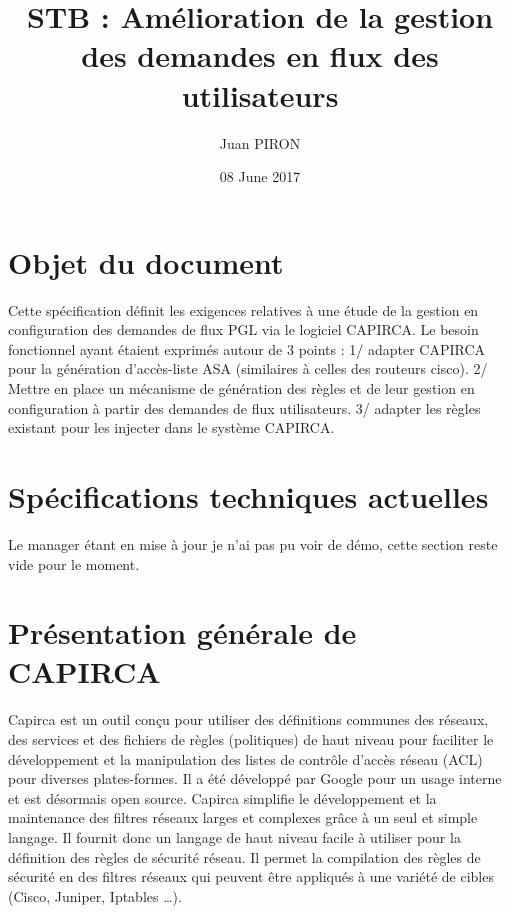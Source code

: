 \documentclass{article}
\title{STB : Amélioration de la gestion des demandes en flux des utilisateurs}
\author{Juan PIRON}
\date{08 June 2017}
\begin{document}
\maketitle
\section{Objet du document}

Cette spécification définit les exigences relatives à une étude de la gestion en configuration des demandes de flux PGL via le logiciel CAPIRCA. Le besoin fonctionnel ayant étaient exprimés autour de 3 points :
1/ adapter CAPIRCA pour la génération d’accès-liste ASA (similaires à celles des routeurs cisco).
2/ Mettre en place un mécanisme de génération des règles et de leur gestion en configuration à partir des demandes de flux utilisateurs. 
3/ adapter les règles existant pour les injecter dans le système CAPIRCA.

\maketitle
\section{Spécifications techniques actuelles}

{\color{red} Le manager étant en mise à jour je n'ai pas pu voir de démo, cette section reste vide pour le moment.}

\maketitle
\section{Présentation générale de CAPIRCA}

Capirca est un outil conçu pour utiliser des définitions communes des réseaux, des services et des fichiers de règles (politiques) de haut niveau pour faciliter le développement et la manipulation des listes de contrôle d'accès réseau (ACL) pour diverses plates-formes. Il a été développé par Google pour un usage interne et est désormais open source.
Capirca simplifie le développement et la maintenance des filtres réseaux larges et complexes grâce à un seul et simple langage. Il fournit donc un langage de haut niveau facile à utiliser pour la définition des règles de sécurité réseau. Il permet la compilation des règles de sécurité en des filtres réseaux qui peuvent être appliqués à une variété de cibles (Cisco, Juniper, Iptables …).
\end{document}
